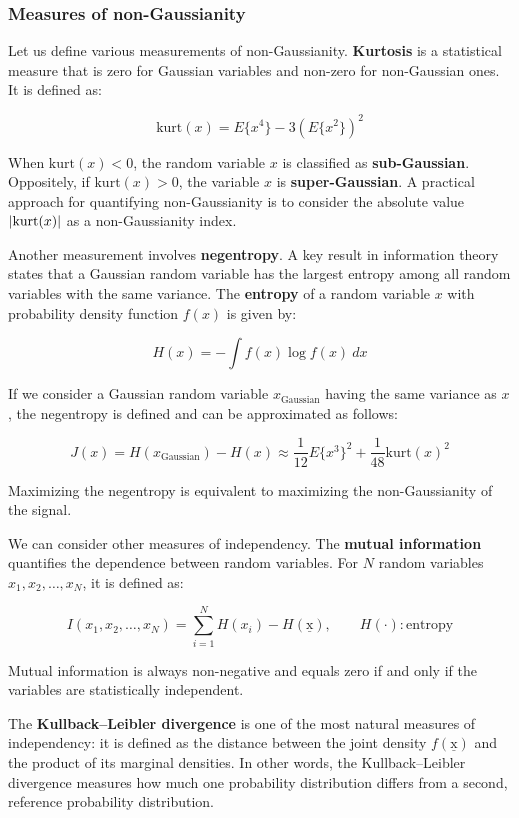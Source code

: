 \subsubsection{Measures of non-Gaussianity}
Let us define various measurements of non-Gaussianity.
\textbf{Kurtosis} is a statistical measure that is zero for Gaussian variables and non-zero for non-Gaussian ones.  
It is defined as:

\[
\mathrm{kurt}(x) = E\{x^4\} - 3 \left( E\{x^2\} \right)^2
\]

When $\mathrm{kurt}(x) < 0$, the random variable $x$ is classified as \textbf{sub-Gaussian}.
Oppositely, if $\mathrm{kurt}(x) > 0$, the variable $x$ is \textbf{super-Gaussian}.  
A practical approach for quantifying non-Gaussianity is to consider the absolute value $\abs{\mathrm{kurt}(x)}$ as a non-Gaussianity index.

Another measurement involves \textbf{negentropy}.
A key result in information theory states that a Gaussian random variable has the largest entropy among all random variables with the same variance.
The \textbf{entropy} of a random variable $x$ with probability density function $f(x)$ is given by:

\[
H(x) = - \int f(x) \log f(x) \ dx
\]

If we consider a Gaussian random variable $x_{\text{Gaussian}}$ having the same variance as $x$, the negentropy is defined  and can be approximated as follows:  

\[
J(x) = H(x_{\text{Gaussian}}) - H(x) \approx \frac{1}{12} E\{x^3\}^2 + \frac{1}{48} \mathrm{kurt}(x)^2
\]

Maximizing the negentropy is equivalent to maximizing the non-Gaussianity of the signal.

We can consider other measures of independency.
The \textbf{mutual information} quantifies the dependence between random variables.  
For $N$ random variables $x_1, x_2, \dots, x_N$, it is defined as:

\[
I(x_1, x_2, \dots, x_N) = \sum_{i=1}^{N} H(x_i) - H(\underline{\mathrm{x}}),
\qquad H(\cdot): \text{entropy}
\]

Mutual information is always non-negative and equals zero if and only if the variables are statistically independent.  

The \textbf{Kullback–Leibler divergence} is one of the most natural measures of independency: it is defined as the distance between the joint density $f(\underline{\mathrm{x}})$ and the product of its marginal densities.
In other words, the Kullback–Leibler divergence measures how much one probability distribution differs from a second, reference probability distribution.

